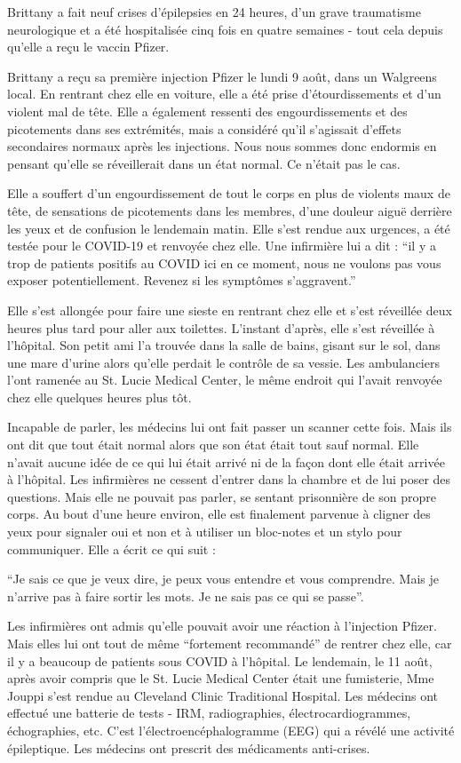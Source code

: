 Brittany a fait neuf crises d'épilepsies en 24 heures, d'un grave traumatisme
neurologique et a été hospitalisée cinq fois en quatre semaines - tout cela
depuis qu'elle a reçu le vaccin Pfizer.

Brittany a reçu sa première injection Pfizer le lundi 9 août, dans un Walgreens
local. En rentrant chez elle en voiture, elle a été prise d'étourdissements et
d'un violent mal de tête. Elle a également ressenti des engourdissements et des
picotements dans ses extrémités, mais a considéré qu'il s'agissait d'effets
secondaires normaux après les injections. Nous nous sommes donc endormis en
pensant qu'elle se réveillerait dans un état normal. Ce n'était pas le cas.

Elle a souffert d'un engourdissement de tout le corps en plus de violents maux
de tête, de sensations de picotements dans les membres, d'une douleur aiguë
derrière les yeux et de confusion le lendemain matin. Elle s'est rendue aux
urgences, a été testée pour le COVID-19 et renvoyée chez elle. Une infirmière
lui a dit : “il y a trop de patients positifs au COVID ici en ce moment, nous ne
voulons pas vous exposer potentiellement. Revenez si les symptômes s'aggravent.”

Elle s'est allongée pour faire une sieste en rentrant chez elle et s'est
réveillée deux heures plus tard pour aller aux toilettes. L'instant d'après,
elle s'est réveillée à l'hôpital. Son petit ami l'a trouvée dans la salle de
bains, gisant sur le sol, dans une mare d'urine alors qu'elle perdait le
contrôle de sa vessie. Les ambulanciers l'ont ramenée au St. Lucie Medical
Center, le même endroit qui l'avait renvoyée chez elle quelques heures plus tôt.

Incapable de parler, les médecins lui ont fait passer un scanner cette
fois. Mais ils ont dit que tout était normal alors que son état était tout sauf
normal. Elle n'avait aucune idée de ce qui lui était arrivé ni de la façon dont
elle était arrivée à l'hôpital. Les infirmières ne cessent d'entrer dans la
chambre et de lui poser des questions. Mais elle ne pouvait pas parler, se
sentant prisonnière de son propre corps. Au bout d'une heure environ, elle est
finalement parvenue à cligner des yeux pour signaler oui et non et à utiliser un
bloc-notes et un stylo pour communiquer. Elle a écrit ce qui suit :

“Je sais ce que je veux dire, je peux vous entendre et vous comprendre. Mais je
n'arrive pas à faire sortir les mots. Je ne sais pas ce qui se passe”.

Les infirmières ont admis qu'elle pouvait avoir une réaction à l'injection
Pfizer. Mais elles lui ont tout de même “fortement recommandé” de rentrer chez
elle, car il y a beaucoup de patients sous COVID à l'hôpital. Le lendemain, le
11 août, après avoir compris que le St. Lucie Medical Center était une
fumisterie, Mme Jouppi s'est rendue au Cleveland Clinic Traditional
Hospital. Les médecins ont effectué une batterie de tests - IRM, radiographies,
électrocardiogrammes, échographies, etc. C'est l'électroencéphalogramme (EEG)
qui a révélé une activité épileptique. Les médecins ont prescrit des médicaments
anti-crises.

